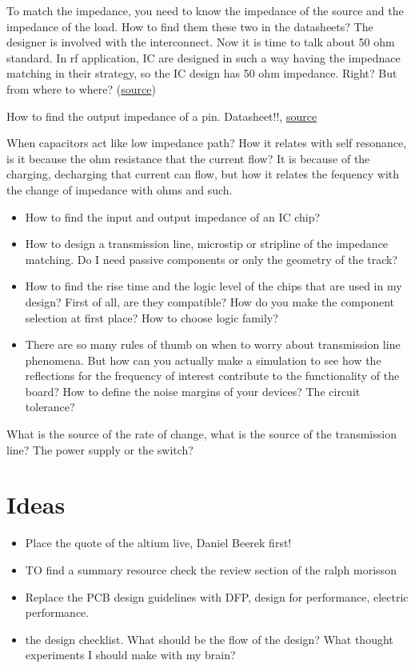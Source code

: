 \documentclass[12pt]{article}
\begin{document}
To match the impedance, you need to know the impedance of the source and the impedance of the load. How to find them these two in the datasheets? The designer is involved with the interconnect. Now it is time to talk about 50 ohm standard. In rf application, IC are designed in such a way having the impednace matching in their strategy, so the IC design has 50 ohm impedance. Right? But from where to where? (\href{https://www.allaboutcircuits.com/textbook/radio-frequency-analysis-design/real-life-rf-signals/the-50-question-impedance-matching-in-rf-design/}{source})

How to find the output impedance of a pin. Datasheet!!, \href{https://electronics.stackexchange.com/questions/127046/what-is-output-impedance-of-a-pin/127050}{source}

When capacitors act like low impedance path? How it relates with self resonance, is it because the ohm resistance that the current flow? It is because of the charging, decharging that current can flow, but how it relates the fequency with the change of impedance with ohms and such.

\begin{itemize}
	\item How to find the input and output impedance of an IC chip?
	\item How to design a transmission line, microstip or stripline of the impedance matching. Do I need passive components or only the geometry of the track?
	\item How to find the rise time and the logic level of the chips that are used in my design? First of all, are they compatible? How do you make the component selection at first place? How to choose logic family?
	\item There are so many rules of thumb on when to worry about transmission line phenomena. But how can you actually make a simulation to see how the reflections for the frequency of interest contribute to the functionality of the board? How to define the noise margins of your devices? The circuit tolerance?
\end{itemize}

What is the source of the rate of change, what is the source of the transmission line? The power supply or the switch?

\section{Ideas}

\begin{itemize}
		\item Place the quote of the altium live, Daniel Beerek first!
		\item TO find a summary resource check the review section of the ralph morisson
		\item Replace the PCB design guidelines with DFP, design for performance, electric performance.
		\item the design checklist. What should be the flow of the design? What thought experiments I should make with my brain?
\end{itemize}
\end{document}
